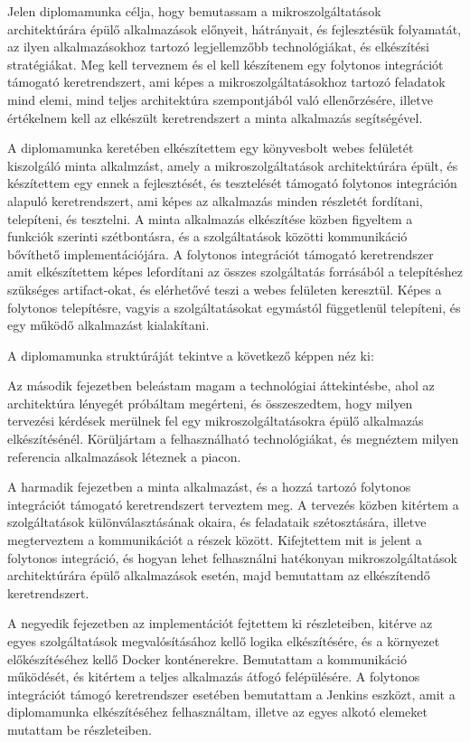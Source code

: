 \documentclass[11pt,magyar,a4paper,twoside,]{report}
\begin{document}
Jelen diplomamunka célja, hogy bemutassam a mikroszolgáltatások
architektúrára épülő alkalmazások előnyeit, hátrányait, és fejlesztésük
folyamatát, az ilyen alkalmazásokhoz tartozó legjellemzőbb
technológiákat, és elkészítési stratégiákat. Meg kell terveznem és el
kell készítenem egy folytonos integrációt támogató keretrendszert, ami
képes a mikroszolgáltatásokhoz tartozó feladatok mind elemi, mind teljes
architektúra szempontjából való ellenőrzésére, illetve értékelnem kell
az elkészült keretrendszert a minta alkalmazás segítségével.

A diplomamunka keretében elkészítettem egy könyvesbolt webes felületét
kiszolgáló minta alkalmzást, amely a mikroszolgáltatások architektúrára
épült, és készítettem egy ennek a fejlesztését, és tesztelését támogató
folytonos integráción alapuló keretrendszert, ami képes az alkalmazás
minden részletét fordítani, telepíteni, és tesztelni. A minta alkalmazás
elkészítése közben figyeltem a funkciók szerinti szétbontásra, és a
szolgáltatások közötti kommunikáció bővíthető implementációjára. A
folytonos integrációt támogató keretrendszer amit elkészítettem képes
lefordítani az összes szolgáltatás forrásából a telepítéshez szükséges
artifact-okat, és elérhetővé teszi a webes felületen keresztül. Képes a
folytonos telepítésre, vagyis a szolgáltatásokat egymástól függetlenül
telepíteni, és egy működő alkalmazást kialakítani.

A diplomamunka struktúráját tekintve a következő képpen néz ki:

Az második fejezetben beleástam magam a technológiai áttekintésbe, ahol
az architektúra lényegét próbáltam megérteni, és összeszedtem, hogy
milyen tervezési kérdések merülnek fel egy mikroszolgáltatásokra épülő
alkalmazás elkészítésénél. Körüljártam a felhasználható technológiákat,
és megnéztem milyen referencia alkalmazások léteznek a piacon.

A harmadik fejezetben a minta alkalmazást, és a hozzá tartozó folytonos
integrációt támogató keretrendszert terveztem meg. A tervezés közben
kitértem a szolgáltatások különválasztásának okaira, és feladataik
szétosztására, illetve megterveztem a kommunikációt a részek között.
Kifejtettem mit is jelent a folytonos integráció, és hogyan lehet
felhasználni hatékonyan mikroszolgáltatások architektúrára épülő
alkalmazások esetén, majd bemutattam az elkészítendő keretrendszert.

A negyedik fejezetben az implementációt fejtettem ki részleteiben,
kitérve az egyes szolgáltatások megvalósításához kellő logika
elkészítésére, és a környezet előkészítéséhez kellő Docker konténerekre.
Bemutattam a kommunikáció működését, és kitértem a teljes alkalmazás
átfogó felépülésére. A folytonos integrációt támogó keretrendszer
esetében bemutattam a Jenkins eszközt, amit a diplomamunka
elkészítéséhez felhasználtam, illetve az egyes alkotó elemeket mutattam
be részleteiben.
\end{document}
